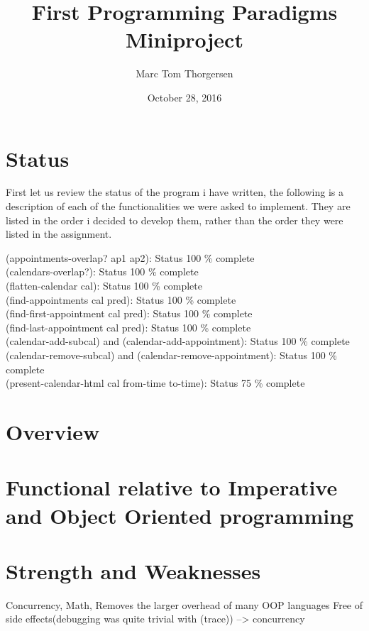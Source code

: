 \documentclass[11pt,a4paper,article,oneside]{memoir}
\title{First Programming Paradigms Miniproject}
\author{Marc Tom Thorgersen}
\date{October 28, 2016}
\begin{document}
\maketitle
\section{Status}
First let us review the status of the program i have written, the following is a description of each of the functionalities we were asked to implement.
They are listed in the order i decided to develop them, rather than the order they were listed in the assignment.
\begin{description}
    \item [(appointments-overlap? ap1 ap2): Status 100 \% complete]
    

    \item [(calendars-overlap?): Status 100 \% complete]

    \item [(flatten-calendar cal): Status 100 \% complete]

    \item [(find-appointments cal pred): Status 100 \% complete]

    \item [(find-first-appointment cal pred): Status 100 \% complete]

    \item [(find-last-appointment cal pred): Status 100 \% complete]

    \item [(calendar-add-subcal) and (calendar-add-appointment): Status 100 \% complete]

    \item [(calendar-remove-subcal) and (calendar-remove-appointment): Status 100 \% complete]

    \item [(present-calendar-html cal from-time to-time): Status 75 \% complete]

\end{description}
\section{Overview}
\section{Functional relative to Imperative and Object Oriented programming}
\section{Strength and Weaknesses}
Concurrency, Math, Removes the larger overhead of many OOP languages
Free of side effects(debugging was quite trivial with (trace)) --> concurrency
\end{document}
